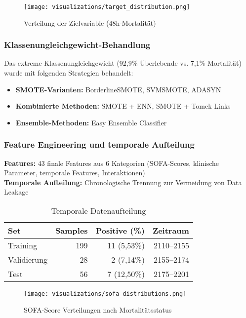 \documentclass[12pt]{article}
\begin{document}
\begin{figure}[H]
\centering
\texttt{[image: visualizations/target\_distribution.png]}
\caption{Verteilung der Zielvariable (48h-Mortalität)}
\label{fig:target_distribution}
\end{figure}

\subsubsection{Klassenungleichgewicht-Behandlung}
Das extreme Klassenungleichgewicht (92,9\% Überlebende vs. 7,1\% Mortalität) wurde mit folgenden Strategien behandelt:
\begin{itemize}
    \item \textbf{SMOTE-Varianten:} BorderlineSMOTE, SVMSMOTE, ADASYN
    \item \textbf{Kombinierte Methoden:} SMOTE + ENN, SMOTE + Tomek Links
    \item \textbf{Ensemble-Methoden:} Easy Ensemble Classifier
\end{itemize}

\subsubsection{Feature Engineering und temporale Aufteilung}
\textbf{Features:} 43 finale Features aus 6 Kategorien (SOFA-Scores, klinische Parameter, temporale Features, Interaktionen)\\
\textbf{Temporale Aufteilung:} Chronologische Trennung zur Vermeidung von Data Leakage

\begin{table}[H]
\centering
\begin{tabular}{lrrr}
\toprule
\textbf{Set} & \textbf{Samples} & \textbf{Positive (\%)} & \textbf{Zeitraum} \\
\midrule
Training & 199 & 11 (5,53\%) & 2110--2155 \\
Validierung & 28 & 2 (7,14\%) & 2155--2174 \\
Test & 56 & 7 (12,50\%) & 2175--2201 \\
\bottomrule
\end{tabular}
\caption{Temporale Datenaufteilung}
\end{table}

\begin{figure}[H]
\centering
\texttt{[image: visualizations/sofa\_distributions.png]}
\caption{SOFA-Score Verteilungen nach Mortalitätsstatus}
\label{fig:sofa_distributions}
\end{figure}
\end{document}
